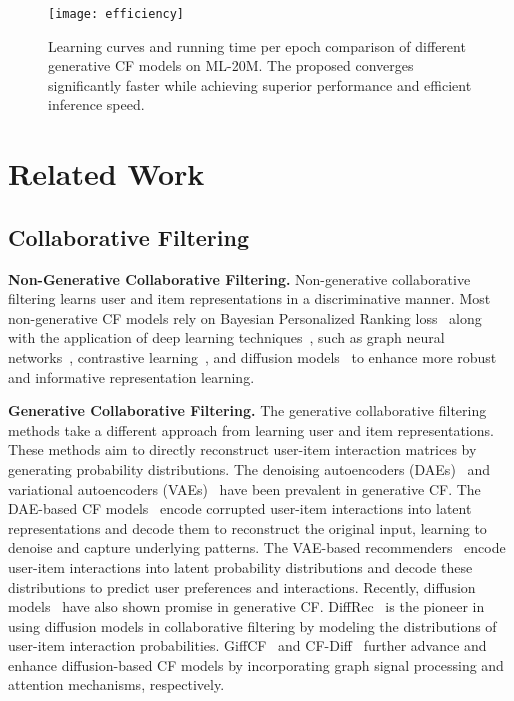 \documentclass[sigconf]{acmart}
\begin{document}
\vspace{-3pt}
\begin{figure}[ht]
	\setlength{\abovecaptionskip}{0.1cm}
    \setlength{\belowcaptionskip}{-0.4cm}
    \centering
    \texttt{[image: efficiency]}
    \caption{Learning curves and running time per epoch comparison of different generative CF models on ML-20M. The proposed \ours converges significantly faster while achieving superior performance and efficient inference speed.}
    \label{fig:efficiency}
\end{figure}

\section{Related Work}

\subsection{Collaborative Filtering}

\noindent \textbf{Non-Generative Collaborative Filtering.}
Non-generative collaborative filtering learns user and item representations in a discriminative manner. Most non-generative CF models rely on Bayesian Personalized Ranking loss~\cite{rendle2012bpr} along with the application of deep learning techniques~\cite{he2017neural}, such as graph neural networks~\cite{wang2019neural, he2020lightgcn}, contrastive learning~\cite{wujc2021self, lin2022improving, yu2022graph, liu2024twincl}, and diffusion models~\cite{zhao2024denoising, yi2024directional} to enhance more robust and informative representation learning.

\noindent \textbf{Generative Collaborative Filtering.}
The generative collaborative filtering methods take a different approach from learning user and item representations. These methods aim to directly reconstruct user-item interaction matrices by generating probability distributions. The denoising autoencoders (DAEs)~\cite{vincent2008extracting, bengio2013generalized} and variational autoencoders (VAEs)~\cite{kingma2013auto} have been prevalent in generative CF. The DAE-based CF models~\cite{wu2016collaborative, liang2018variational} encode corrupted user-item interactions into latent representations and decode them to reconstruct the original input, learning to denoise and capture underlying patterns. The VAE-based recommenders~\cite{liang2018variational, ma2019learning, shenbin2020recvae} encode user-item interactions into latent probability distributions and decode these distributions to predict user preferences and interactions.
Recently, diffusion models~\cite{lin2024survey} have also shown promise in generative CF. DiffRec~\cite{wang2023diffusion} is the pioneer in using diffusion models in collaborative filtering by modeling the distributions of user-item interaction probabilities. GiffCF~\cite{zhu2024graph} and CF-Diff~\cite{hou2024collaborative} further advance and enhance diffusion-based CF models by incorporating graph signal processing and attention mechanisms, respectively.
\end{document}
